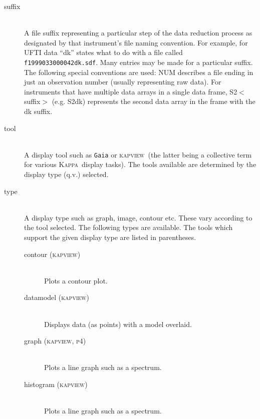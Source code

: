 \documentclass[twoside,11pt]{article}
\newcommand{\xref}[3]{#1}
\renewcommand{\_}{\texttt{\symbol{95}}}
\newcommand{\underscore}{\_}
\newcommand{\Kappa}{\xref{{\textsc{Kappa}}}{sun95}{}}
\newcommand{\kapview}{\textsc{kapview}}
\begin{document}
\begin{description}

\item[suffix]
\hfil\\
A file suffix representing a particular step of the data reduction
process as designated by that instrument's file naming convention. For
example, for UFTI data ``dk'' states what to do with a file called
{\tt f19990330\underscore{}00042\underscore{}dk.sdf\/}. Many entries may be made for a particular
suffix. The following special conventions are used: NUM describes a
file ending in just an observation number (usually representing raw
data). For instruments that have multiple data arrays in a single data
frame, S2$<$suffix$>$ (e.g. S2dk) represents the second data array in the
frame with the \underscore{}dk suffix.

\item[tool]
\hfil\\
A display tool such as {\tt Gaia} or \kapview\ (the latter being a collective
term for various \Kappa\ display tasks). The tools available are
determined by the display type (q.v.) selected.

\item[type]
\hfil\\
A display type such as graph, image, contour etc. These vary according 
to the tool selected.   The following types are available.  The tools
which support the given display type are listed in parentheses.

\begin{description}

\item[contour (\kapview)]
\hfil\\
Plots a contour plot.

\item[datamodel (\kapview)]
\hfil\\
Displays data (as points) with a model overlaid.

\item[graph (\kapview, \textsc{p4})]
\hfil\\
Plots a line graph such as a spectrum.

\item[histogram (\kapview)]
\hfil\\
Plots a line graph such as a spectrum.


\end{description}
\end{description}
\end{document}
